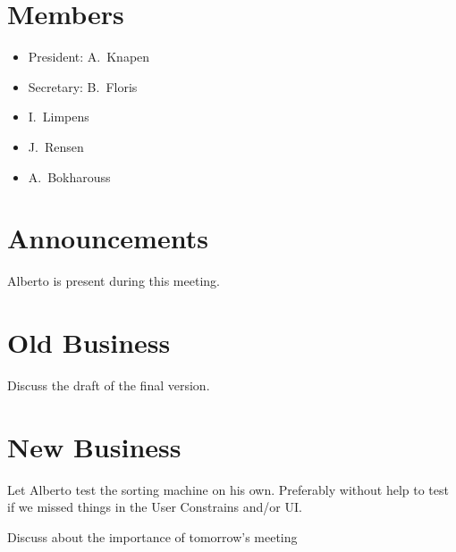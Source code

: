 \section{Members}
\begin{itemize}
	\item President: A.~Knapen
    \item Secretary: B.~Floris
    \item I.~Limpens
	\item J.~Rensen
    \item A.~Bokharouss
\end{itemize}

\section{Announcements}
\begin{items}
	\item Alberto is present during this meeting.
\end{items}


\section{Old Business}
\begin{items}
	\item Discuss the draft of the final version.
\end{items}


\section{New Business}
\begin{items}
    \item Let Alberto test the sorting machine on his own. Preferably without help to test if we missed things in the User Constrains and/or UI.
    \item Discuss about the importance of tomorrow's meeting
\end{items}

\vspace{1em}
